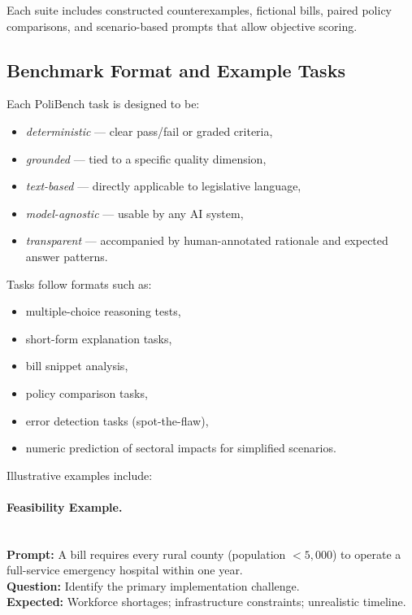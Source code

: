 \documentclass[12pt]{article}
\begin{document}
Each suite includes constructed counterexamples, fictional bills, paired policy comparisons, and scenario-based prompts
that allow objective scoring.

\subsection{Benchmark Format and Example Tasks}

Each PoliBench task is designed to be:

\begin{itemize}
    \item \emph{deterministic} --- clear pass/fail or graded criteria,
    \item \emph{grounded} --- tied to a specific quality dimension,
    \item \emph{text-based} --- directly applicable to legislative language,
    \item \emph{model-agnostic} --- usable by any AI system,
    \item \emph{transparent} --- accompanied by human-annotated rationale and expected answer patterns.
\end{itemize}

Tasks follow formats such as:

\begin{itemize}
    \item multiple-choice reasoning tests,
    \item short-form explanation tasks,
    \item bill snippet analysis,
    \item policy comparison tasks,
    \item error detection tasks (spot-the-flaw),
    \item numeric prediction of sectoral impacts for simplified scenarios.
\end{itemize}

Illustrative examples include:

\paragraph{Feasibility Example.} \mbox{}\\
\textbf{Prompt:} A bill requires every rural county (population $< 5{,}000$) to operate a full-service emergency hospital
within one year.\\
\textbf{Question:} Identify the primary implementation challenge.\\
\textbf{Expected:} Workforce shortages; infrastructure constraints; unrealistic timeline.
\end{document}
